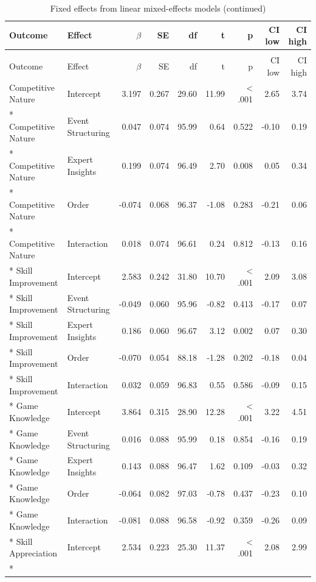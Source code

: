 \begin{longtable}{l l r r r r r r r}
\caption{\label{tab:fixed_effects}Fixed effects from linear mixed-effects models}\\
\toprule
Outcome & Effect & $\beta$ & SE & df & t & p & CI low & CI high\\
\midrule
\endfirsthead
\caption[]{Fixed effects from linear mixed-effects models (continued)}\\
\toprule
Outcome & Effect & $\beta$ & SE & df & t & p & CI low & CI high\\
\midrule
\endhead
\bottomrule
\endlastfoot
Competitive Nature & Intercept & 3.197 & 0.267 & 29.60 & 11.99 & < .001 & 2.65 & 3.74\\*
Competitive Nature & Event Structuring & 0.047 & 0.074 & 95.99 & 0.64 & 0.522 & -0.10 & 0.19\\*
Competitive Nature & Expert Insights & 0.199 & 0.074 & 96.49 & 2.70 & 0.008 & 0.05 & 0.34\\*
Competitive Nature & Order & -0.074 & 0.068 & 96.37 & -1.08 & 0.283 & -0.21 & 0.06\\*
Competitive Nature & Interaction & 0.018 & 0.074 & 96.61 & 0.24 & 0.812 & -0.13 & 0.16\\*
Skill Improvement & Intercept & 2.583 & 0.242 & 31.80 & 10.70 & < .001 & 2.09 & 3.08\\*
Skill Improvement & Event Structuring & -0.049 & 0.060 & 95.96 & -0.82 & 0.413 & -0.17 & 0.07\\*
Skill Improvement & Expert Insights & 0.186 & 0.060 & 96.67 & 3.12 & 0.002 & 0.07 & 0.30\\*
Skill Improvement & Order & -0.070 & 0.054 & 88.18 & -1.28 & 0.202 & -0.18 & 0.04\\*
Skill Improvement & Interaction & 0.032 & 0.059 & 96.83 & 0.55 & 0.586 & -0.09 & 0.15\\*
Game Knowledge & Intercept & 3.864 & 0.315 & 28.90 & 12.28 & < .001 & 3.22 & 4.51\\*
Game Knowledge & Event Structuring & 0.016 & 0.088 & 95.99 & 0.18 & 0.854 & -0.16 & 0.19\\*
Game Knowledge & Expert Insights & 0.143 & 0.088 & 96.47 & 1.62 & 0.109 & -0.03 & 0.32\\*
Game Knowledge & Order & -0.064 & 0.082 & 97.03 & -0.78 & 0.437 & -0.23 & 0.10\\*
Game Knowledge & Interaction & -0.081 & 0.088 & 96.58 & -0.92 & 0.359 & -0.26 & 0.09\\*
Skill Appreciation & Intercept & 2.534 & 0.223 & 25.30 & 11.37 & < .001 & 2.08 & 2.99\\*

\end{longtable}
